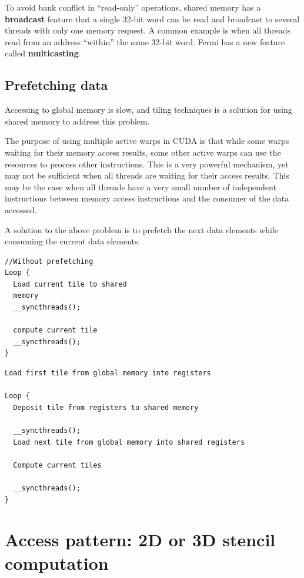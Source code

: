 \begin{framed}
  To avoid bank conflict in ``read-only'' operations, shared memory
  has a {\bf broadcast} feature that a single 32-bit word can be read
  and broadcast to several threads with only one memory request. A
  common example is when all threads read from an address ``within''
  the same 32-bit word. Fermi has a new feature called {\bf
    multicasting}. 
\end{framed}



\subsection{Prefetching data}
\label{sec:prefetching-data}

Accessing to global memory is slow, and tiling techniques is a
solution for using shared memory to address this problem.

The purpose of using multiple active warps in CUDA is that while some
warps waiting for their memory access results, some other active warps
can use the resources to process other instructions. This is a very
powerful mechanism, yet may not be sufficient when all threads are
waiting for their access results. This may be the case when all
threads have a very small number of independent instructions between
memory access instructions and the consumer of the data accessed. 

A solution to the above problem is to prefetch the next data elements
while consuming the current data elements. 
\begin{verbatim}
//Without prefetching
Loop {
  Load current tile to shared
  memory
  __syncthreads();

  compute current tile
  __syncthreads();
}
\end{verbatim}


\begin{verbatim}
Load first tile from global memory into registers

Loop {
  Deposit tile from registers to shared memory

  __syncthreads();
  Load next tile from global memory into shared registers

  Compute current tiles

  __syncthreads();
}
\end{verbatim}

\section{Access pattern: 2D or 3D stencil computation}
\label{sec:2d-or-3d}

